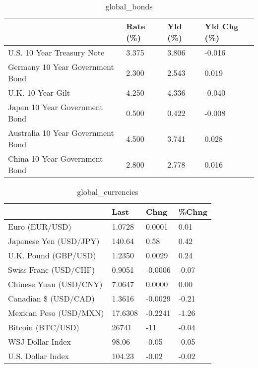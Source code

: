 \documentclass{article}%
\begin{document}
%


\begin{table}[htbp]%
\caption{global\_bonds}%
\centering%
\begin{adjustbox}{width=1\textwidth}%
\begin{tabular}{llll}
\toprule
                                  & Rate (\%) & Yld (\%) & Yld Chg (\%) \\
\midrule
       U.S. 10 Year Treasury Note &    3.375 &   3.806 &      -0.016 \\
  Germany 10 Year Government Bond &    2.300 &   2.543 &       0.019 \\
                U.K. 10 Year Gilt &    4.250 &   4.336 &      -0.040 \\
    Japan 10 Year Government Bond &    0.500 &   0.422 &      -0.008 \\
Australia 10 Year Government Bond &    4.500 &   3.741 &       0.028 \\
    China 10 Year Government Bond &    2.800 &   2.778 &       0.016 \\
\bottomrule
\end{tabular}
%
\end{adjustbox}%
\end{table}

%


\begin{table}[htbp]%
\caption{global\_currencies}%
\centering%
\begin{adjustbox}{width=1\textwidth}%
\begin{tabular}{llll}
\toprule
                       &    Last &    Chng & \%Chng \\
\midrule
        Euro (EUR/USD) &  1.0728 &  0.0001 &  0.01 \\
Japanese Yen (USD/JPY) &  140.64 &    0.58 &  0.42 \\
  U.K. Pound (GBP/USD) &  1.2350 &  0.0029 &  0.24 \\
 Swiss Franc (USD/CHF) &  0.9051 & -0.0006 & -0.07 \\
Chinese Yuan (USD/CNY) &  7.0647 &  0.0000 &  0.00 \\
  Canadian \$ (USD/CAD) &  1.3616 & -0.0029 & -0.21 \\
Mexican Peso (USD/MXN) & 17.6308 & -0.2241 & -1.26 \\
     Bitcoin (BTC/USD) &   26741 &     -11 & -0.04 \\
      WSJ Dollar Index &   98.06 &   -0.05 & -0.05 \\
     U.S. Dollar Index &  104.23 &   -0.02 & -0.02 \\
\bottomrule
\end{tabular}
%
\end{adjustbox}%
\end{table}
\end{document}
